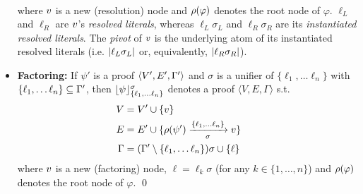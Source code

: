 \begin{definition}
\begin{itemize}
\begin{align*}
    \end{align*}
    where $v$ is a new (resolution) node and $\rho(\varphi)$ denotes the root node of $\varphi$. $\ell_L$ and $\ell_R$ are $v$'s \emph{resolved literals}, whereas $\ell_L \sigma_L$ and $\ell_R \sigma_R$ are its \emph{instantiated resolved literals}. The \emph{pivot} of $v$ is the underlying atom of its instantiated resolved literals (i.e. $\lvert\ell_L \sigma_L\rvert$ or, equivalently, $\lvert\ell_R \sigma_R\rvert$).
  \item \textbf{Factoring:}
  If $\psi'$ is a proof $\langle V', E', \Gamma' \rangle$ and $\sigma$ is a unifier of $\{\ell_1, \ldots \ell_n\}$ with $\{\ell_1, \ldots \ell_n\} \subseteq \Gamma'$, then $\lfloor \psi \rfloor_{\{\ell_1, \ldots \ell_n\}}^{\sigma}$ denotes a proof $\langle V, E, \Gamma \rangle$ s.t.
    \begin{align*}
         \hspace{-0.6cm} V &= V' \cup \{\n \} \\
         \hspace{-0.6cm} E &= E' \cup \{ \raiz{\psi'} \xrightarrow[\sigma]{\{\ell_1, \ldots \ell_n\}} \n \} \\
       \hspace{-0.6cm} \Gamma &= (\clause' \setminus \{ \ell_1, \ldots \ell_n \} ) \sigma \cup \{ \ell \}
    \end{align*}
    where $v$ is a new (factoring) node, $\ell = \ell_k \sigma$ (for any $k \in \{1,\ldots, n\}$) and $\rho(\varphi)$ denotes the root node of $\varphi$.
  \qed
\end{itemize}
\end{definition}


